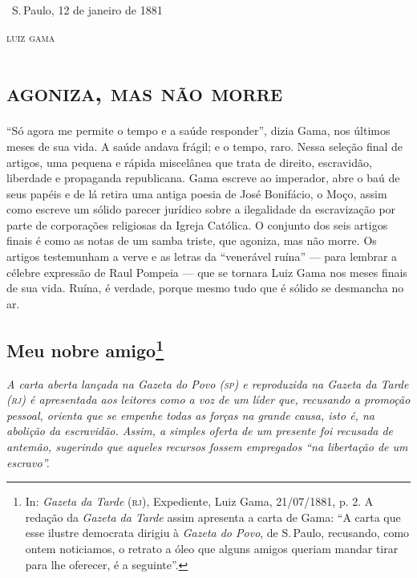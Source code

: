 \bigskip

\hfill\ S.\,Paulo, 12 de janeiro de 1881

\hfill\textsc{luiz gama}

\begingroup\makeatletter\@openrightfalse
\part{\textsc{agoniza, mas não morre}}

\mbox{}\vfill
\thispagestyle{empty}

{\footnotesize\noindent
``Só agora me permite o tempo e a saúde responder'', dizia Gama, nos
últimos meses de sua vida. A saúde andava frágil; e o tempo, raro. Nessa
seleção final de artigos, uma pequena e rápida miscelânea que trata de
direito, escravidão, liberdade e propaganda republicana. Gama escreve ao
imperador, abre o baú de seus papéis e de lá retira uma antiga poesia de
José Bonifácio, o Moço, assim como escreve um sólido parecer jurídico
sobre a ilegalidade da escravização por parte de corporações religiosas
da Igreja Católica. O conjunto dos seis artigos finais é como as notas
de um samba triste, que agoniza, mas não morre. Os artigos testemunham a
verve e as letras da ``venerável ruína'' --- para lembrar a célebre
expressão de Raul Pompeia --- que se tornara Luiz Gama nos meses finais
de sua vida. Ruína, é verdade, porque mesmo tudo que é sólido se
desmancha no ar.}
\@openrighttrue\makeatother\endgroup


\chapter{Meu nobre amigo\footnote[*]{In: \emph{Gazeta da Tarde} (\textsc{rj}),
  Expediente, Luiz Gama, 21/07/1881, p. 2. A redação da \emph{Gazeta da
  Tarde} assim apresenta a carta de Gama: ``A carta que esse ilustre
  democrata dirigiu à \emph{Gazeta do Povo}, de S.\,Paulo, recusando,
  como ontem noticiamos, o retrato a óleo que alguns amigos queriam
  mandar tirar para lhe oferecer, é a seguinte''.}}

\begin{flushleft}
{\footnotesize\itshape
A carta aberta lançada na \emph{Gazeta do Povo} (\textsc{sp}) e reproduzida na
\emph{Gazeta da Tarde} (\textsc{rj}) é apresentada aos leitores como a voz de um líder
que, recusando a promoção pessoal, orienta que se empenhe todas as
forças na grande causa, isto é, na abolição da escravidão. Assim, a
simples oferta de um presente foi recusada de antemão, sugerindo que
aqueles recursos fossem empregados ``na libertação de um escravo''. }
\end{flushleft}

